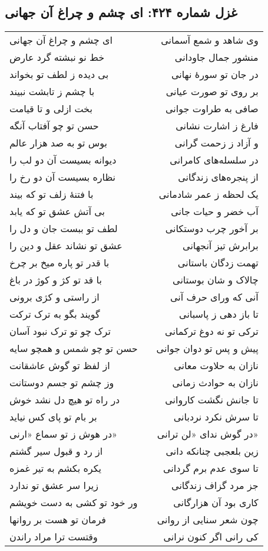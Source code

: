 \begin{center}
\section*{غزل شماره ۴۲۴: ای چشم و چراغ آن جهانی}
\label{sec:424}
\begin{longtable}{l p{0.5cm} r}
ای چشم و چراغ آن جهانی
&&
وی شاهد و شمع آسمانی
\\
خط نو نبشته گرد عارض
&&
منشور جمال جاودانی
\\
بی دیده ز لطف تو بخواند
&&
در جان تو سورهٔ نهانی
\\
با چشم ز تابشت نبیند
&&
بر روی تو صورت عیانی
\\
بخت ازلی و تا قیامت
&&
صافی به طراوت جوانی
\\
حسن تو چو آفتاب آنگه
&&
فارغ ز اشارت نشانی
\\
بوس تو به صد هزار عالم
&&
و آزاد ز زحمت گرانی
\\
دیوانه بسیست آن دو لب را
&&
در سلسله‌های کامرانی
\\
نظاره بسیست آن دو رخ را
&&
از پنجره‌های زندگانی
\\
با فتنهٔ زلف تو که بیند
&&
یک لحظه ز عمر شادمانی
\\
بی آتش عشق تو که یابد
&&
آب خضر و حیات جانی
\\
لطف تو ببست جان و دل را
&&
بر آخور چرب دوستکانی
\\
عشق تو نشاند عقل و دین را
&&
برابرش تیز آنجهانی
\\
با قدر تو پاره میخ بر چرخ
&&
تهمت زدگان باستانی
\\
با قد تو کژ و کوژ در باغ
&&
چالاک و شان بوستانی
\\
از راستی و کژی برونی
&&
آنی که ورای حرف آنی
\\
گویند بگو به ترک ترکت
&&
تا باز دهی ز پاسبانی
\\
ترک چو تو ترک نبود آسان
&&
ترکی تو نه دوغ ترکمانی
\\
حسن تو چو شمس و همچو سایه
&&
پیش و پس تو دوان جوانی
\\
از لفظ تو گوش عاشقانت
&&
نازان به حلاوت معانی
\\
وز چشم تو جسم دوستانت
&&
نازان به حوادث زمانی
\\
در راه تو هیچ دل نشد خوش
&&
تا جانش نگشت کاروانی
\\
بر بام تو پای کس نیاید
&&
تا سرش نکرد نردبانی
\\
در هوش ز تو سماع «ارنی»
&&
در گوش ندای «لن ترانی»
\\
از رد و قبول سیر گشتم
&&
زین بلعجبی چنانکه دانی
\\
یکره بکشم به تیر غمزه
&&
تا سوی عدم برم گردانی
\\
زیرا سر عشق تو ندارد
&&
جز مرد گزاف زندگانی
\\
ور خود تو کشی به دست خویشم
&&
کاری بود آن هزارگانی
\\
فرمان تو هست بر روانها
&&
چون شعر سنایی از روانی
\\
وقتست ترا مراد راندن
&&
کی رانی اگر کنون نرانی
\\
\end{longtable}
\end{center}
